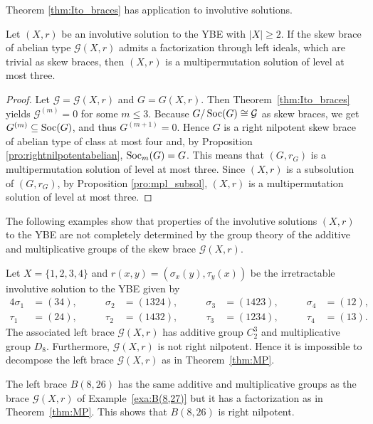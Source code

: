Theorem \ref{thm:Ito_braces} has application to involutive solutions. 

\begin{theorem} 
\label{thm:MP}
Let $(X,r)$ be an involutive solution to the YBE with $|X|\geq 2$.
If the skew brace of abelian type $\mathcal{G}(X,r)$ admits a factorization through left ideals, 
which are trivial as skew braces, then $(X,r)$ is a
multipermutation solution of level at most three.
\end{theorem}

\begin{proof}
Let $\mathcal{G}=\mathcal{G}(X,r)$ and $G=G(X,r)$. Then Theorem~\ref{thm:Ito_braces} 
yields $\mathcal{G}^{(m)}=0$ for some $m\leq 3$. Because $G/\operatorname{Soc}(G)\cong \mathcal{G}$
as skew braces, we get $G^{(m)}\subseteq\operatorname{Soc}(G)$, and thus $G^{(m+1)}=0$. Hence $G$ is a right nilpotent skew brace of abelian type of class at most four and,
by Proposition \ref{pro:rightnilpotentabelian}, $\operatorname{Soc}_m(G)=G$. This means that $(G,r_G)$ is a multipermutation solution of level at most three. Since $(X,r)$ is a subsolution of $(G,r_G)$, by Proposition \ref{pro:mpl_subsol},  
$(X,r)$ is a multipermutation solution of level at most three.
\end{proof}

The following examples show that properties of the involutive  solutions $(X,r)$ to the YBE are not completely determined by the
group theory of the additive and multiplicative groups of the skew brace $\mathcal{G}(X,r)$. 

\begin{example}
\label{exa:B(8,27)}
Let $X=\{1,2,3,4\}$ and $r(x,y)=(\sigma_x(y),\tau_y(x))$ be the irretractable involutive solution to the YBE given by 
\begin{alignat*}{4}
    \sigma_1 & =(34),\qquad & \sigma_2 & =(1324),\qquad & \sigma_3 & =(1423),\qquad & \sigma_4 & =(12),\\
    \tau_1 & =(24),\qquad & \tau_2 & =(1432),\qquad & \tau_3 & =(1234),\qquad & \tau_4 & =(13).
\end{alignat*}
The associated left brace $\mathcal{G}(X,r)$ has additive group $C_2^3$ and multiplicative group $D_8$. Furthermore,
$\mathcal{G}(X,r)$ is not right nilpotent. Hence it is impossible to decompose the left brace $\mathcal{G}(X,r)$ as in Theorem~\ref{thm:MP}. 
\end{example}

\begin{example}
The left brace $B(8,26)$ has the same additive and multiplicative groups as the brace $\mathcal{G}(X,r)$ 
of Example~\ref{exa:B(8,27)} but it has a factorization as in Theorem~\ref{thm:MP}. 
This shows that $B(8,26)$ is right nilpotent. 
\end{example}




